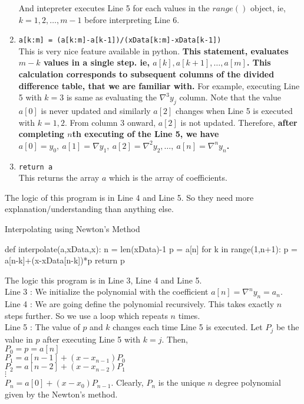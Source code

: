 \begin{commentary}
\begin{enumerate}[label=Line \arabic*]
		And intepreter executes Line 5 for each values in the $range()$ object, ie, $k=1,2,\dots, m-1$ before interpreting Line 6.
	\item \texttt{a[k:m] = (a[k:m]-a[k-1])/(xData[k:m]-xData[k-1])}\\
		This is very nice feature available in python.
		\textbf{
			This statement, evaluates $m-k$ values in a single step.
			ie, $a[k],a[k+1],\dots,a[m]$.
			This calculation corresponds to subsequent columns of the divided difference table, that we are familiar with.
		}
		For example, executing Line 5 with $k=3$ is same as evaluating the $\nabla^3y_j$ column.
		Note that the value $a[0]$ is never updated and similarly $a[2]$ changes when Line 5 is executed with $k=1,2$.
		From column 3 onward, $a[2]$ is not updated.
		Therefore, \textbf{after completing $n$th executing of the Line 5, we have $a[0] = y_0,\ a[1]=\nabla y_1,\ a[2]=\nabla^2 y_2,\dots,\ a[n]=\nabla^n y_n$.}
	\item \texttt{return a}\\
		This returns the array $a$ which is the array of coefficients.
\end{enumerate}
	The logic of this program is in Line 4 and Line 5.
	So they need more explanation/understanding than anything else.
\end{commentary}

\begin{program}Interpolating using Newton's Method
	\begin{python}
		def interpolate(a,xData,x):
			n = len(xData)-1
			p = a[n]
			for k in range(1,n+1):
				p = a[n-k]+(x-xData[n-k])*p
			return p
	\end{python}
	The logic this program is in Line 3, Line 4 and Line 5.\\

	Line 3 : We initialize the polynomial with the coefficient $a[n] = \nabla^n y_n = a_n$.\\

	Line 4 : We are going define the polynomial recursively.
	This takes exactly $n$ steps further.
	So we use a loop which repeats $n$ times.\\

	Line 5 : The value of $p$ and $k$ changes each time Line 5 is executed.
	Let $P_j$ be the value in $p$ after executing Line 5 with $k=j$.
	Then,\\ $P_0 = p = a[n]$\\ $P_1 = a[n-1]+(x-x_{n-1})P_0$\\ $P_2 = a[n-2]+(x-x_{n-2})P_1$\\ $\vdots$\\ $P_n = a[0]+(x-x_0)P_{n-1}$.
	Clearly, $P_n$ is the unique $n$ degree polynomial given by the Newton's method.
\end{program}

